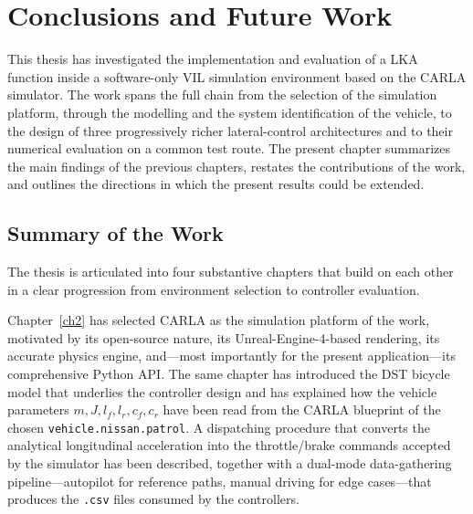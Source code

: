 %

\chapter{Conclusions and Future Work}
\label{ch5}

This thesis has investigated the implementation and evaluation of a \ac{LKA} function inside a software-only \ac{VIL} simulation environment based on the CARLA simulator. The work spans the full chain from the selection of the simulation platform, through the modelling and the system identification of the vehicle, to the design of three progressively richer lateral-control architectures and to their numerical evaluation on a common test route. The present chapter summarizes the main findings of the previous chapters, restates the contributions of the work, and outlines the directions in which the present results could be extended.

\section{Summary of the Work}
The thesis is articulated into four substantive chapters that build on each other in a clear progression from environment selection to controller evaluation.

Chapter~\ref{ch2} has selected CARLA as the simulation platform of the work, motivated by its open-source nature, its Unreal-Engine-4-based rendering, its accurate physics engine, and---most importantly for the present application---its comprehensive Python API. The same chapter has introduced the \acs{DST} bicycle model that underlies the controller design and has explained how the vehicle parameters $m, J, l_f, l_r, c_f, c_r$ have been read from the CARLA blueprint of the chosen \texttt{vehicle.nissan.patrol}. A dispatching procedure that converts the analytical longitudinal acceleration into the throttle/brake commands accepted by the simulator has been described, together with a dual-mode data-gathering pipeline---autopilot for reference paths, manual driving for edge cases---that produces the \texttt{.csv} files consumed by the controllers.


